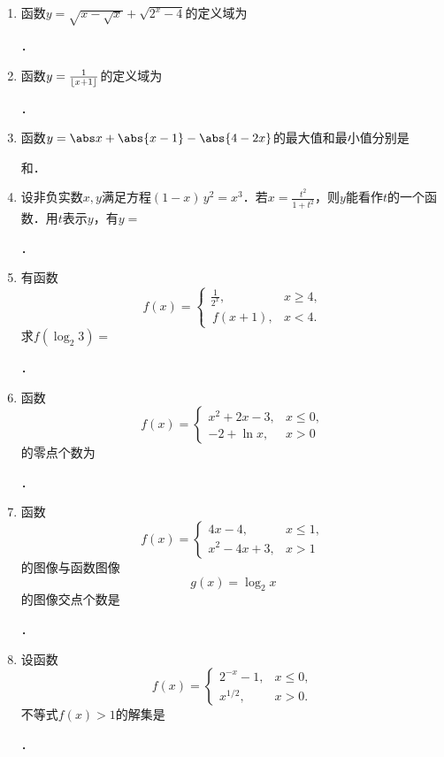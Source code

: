 \documentclass[a4paper,punct=CCT]{ctexbook}
\theoremstyle{definition}
\theoremstyle{remark}
\newif\ifshowsol
\let\leq\leqslant
\let\le\leq
\let\geq\geqslant
\let\ge\geq}
\begin{document}
\begin{enumerate}
\item 函数\(y = \sqrt{x - \sqrt{x}} + \sqrt{2^x - 4}\)的定义域为
  \ifshowsol
  \uline{\makebox[5em]{\(\brktparen{2, +\infty}\)}}．
  \else
  \uline{\makebox[5em]{}}．
  \fi

\item 函数\(y = \frac1{\lfloor x+1\rfloor}\)的定义域为
  \ifshowsol
  \uline{\makebox[10em]{\(\paren{-\infty, -1} \cup \brktparen{0, +\infty}\)}}．
  \else
  \uline{\makebox[10em]{}}．
  \fi

\item 函数\(y = \abs x + \abs{x-1} - \abs{4-2x}\)的最大值和最小值分别是
  \ifshowsol
  \uline{\makebox[3em]{\(-3\)}}和\uline{\makebox[3em]{\(3\)}}．
  \else
  \uline{\makebox[3em]{}}和\uline{\makebox[3em]{}}．
  \fi

\item 设非负实数\(x, y\)满足方程\((1-x)\,y^2 = x^3\)．若\(x = \frac{t^2}{1+t^2}\)，则\(y\)能看作\(t\)的一个函数．用\(t\)表示\(y\)，有\(y =\)
  \ifshowsol
  \uline{\makebox[6em]{\(t^3/\paren{1+t^2}\)}}．
  \else
  \uline{\makebox[6em]{}}．
  \fi

\item 有函数
  \[
    f(x) =
    \begin{cases}
      \frac1{2^x}, & x \ge 4, \\
      \,f(x+1), & x < 4.
    \end{cases}
  \]
  求\(f(\log_2 3) =\)
  \ifshowsol
  \uline{\makebox[4em]{\(1/{24}\)}}．
  \else
  \uline{\makebox[4em]{}}．
  \fi

\item 函数
  \[
    f(x) =
    \begin{cases}
      x^2 + 2x - 3, & x \le 0, \\
      -2 + \ln x, & x > 0
    \end{cases}
  \]
  的零点个数为
  \ifshowsol
  \uline{\makebox[3em]{\(2\)}}．
  \else
  \uline{\makebox[3em]{}}．
  \fi

\item 函数
  \[
    f(x) =
    \begin{cases}
      4x - 4, & x \le 1, \\
      x^2 - 4x + 3, & x > 1
    \end{cases}
  \]
  的图像与函数图像
  \[
    g(x) = \log_2 x
  \]
  的图像交点个数是
  \ifshowsol
  \uline{\makebox[3em]{\(3\)}}．
  \else
  \uline{\makebox[3em]{}}．
  \fi

\item 设函数
  \[
    f(x) =
    \begin{cases}
      2^{-x} - 1, & x \le 0, \\
      x^{1/2}, & x > 0.
    \end{cases}
  \]
  不等式\(f(x) > 1\)的解集是
  \ifshowsol
  \uline{\makebox[10em]{\(\paren{-\infty, -1} \cup \paren{1, +\infty}\)}}．
  \else
  \uline{\makebox[10em]{}}．
  \fi


\end{enumerate}
\end{document}

